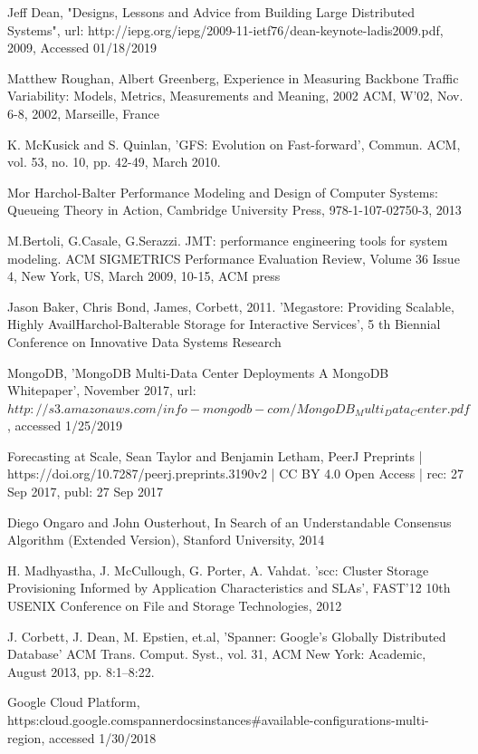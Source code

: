 \documentclass[conference]{IEEEtran}
\begin{document}
\begin{thebibliography}{00}
 Jeff Dean, "Designs, Lessons and Advice from Building Large Distributed Systems", url: http://iepg.org/iepg/2009-11-ietf76/dean-keynote-ladis2009.pdf, 2009, Accessed 01/18/2019

 Matthew Roughan, Albert Greenberg, Experience in Measuring Backbone Traffic Variability: Models, Metrics, Measurements and Meaning, 2002 ACM, W'02, Nov. 6-8, 2002, Marseille, France

K. McKusick and S. Quinlan, 'GFS: Evolution on Fast-forward', Commun. ACM, vol. 53, no. 10, pp. 42-49, March 2010.

 Mor Harchol-Balter Performance Modeling and Design of Computer Systems: Queueing Theory in Action, Cambridge University Press, 978-1-107-02750-3, 2013

M.Bertoli, G.Casale, G.Serazzi.
JMT: performance engineering tools for system modeling.
ACM SIGMETRICS Performance Evaluation Review, Volume 36 Issue 4, New York, US, March 2009, 10-15, ACM press

 Jason Baker, Chris Bond, James, Corbett, 2011. 'Megastore: Providing Scalable, Highly Avail{Harchol-Balter}able Storage for Interactive Services', 5
th Biennial Conference on Innovative Data Systems Research

MongoDB, 'MongoDB Multi-Data Center Deployments A MongoDB Whitepaper', November 2017, url:$http://s3.amazonaws.com/info-mongodb-com/MongoDB_Multi_Data_Center.pdf$, accessed 1/25/2019

 Forecasting at Scale, Sean Taylor and Benjamin Letham, PeerJ Preprints | https://doi.org/10.7287/peerj.preprints.3190v2 | CC BY 4.0 Open Access | rec: 27 Sep 2017, publ: 27 Sep 2017

 Diego Ongaro and John Ousterhout, In Search of an Understandable Consensus Algorithm
(Extended Version), Stanford University, 2014

 H. Madhyastha, J. McCullough, G. Porter, A. Vahdat. 'scc: Cluster Storage Provisioning Informed by Application Characteristics and SLAs', FAST'12 10th USENIX Conference on File and Storage Technologies, 2012

 J. Corbett, J. Dean, M. Epstien, et.al, 'Spanner: Google’s Globally Distributed Database' ACM Trans. Comput. Syst., vol. 31, ACM New York: Academic, August 2013, pp. 8:1--8:22.

 Google Cloud Platform, \\
https:\/\/cloud.google.com\/spanner\/docs\/instances\#available-configurations-multi-region,
accessed 1/30/2018


\end{thebibliography}
\end{document}
